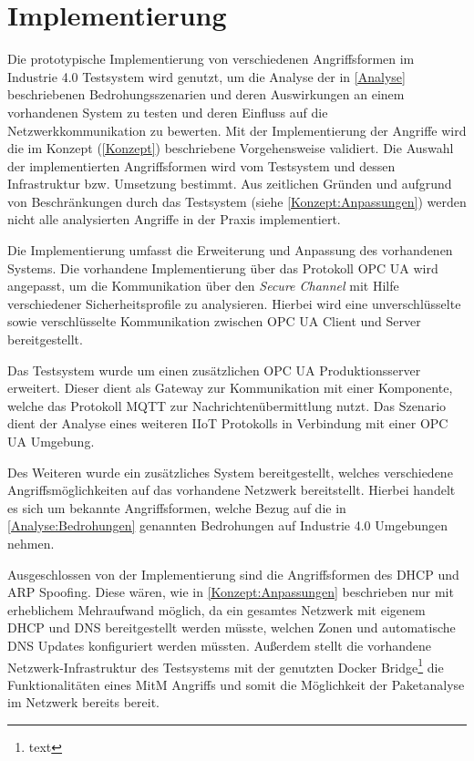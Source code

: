 \chapter{Implementierung}
Die prototypische Implementierung von verschiedenen Angriffsformen im Industrie 4.0 Testsystem wird genutzt, um die Analyse der in \autoref{Analyse} beschriebenen Bedrohungsszenarien und deren Auswirkungen an einem vorhandenen System zu testen und deren Einfluss auf die Netzwerkkommunikation zu bewerten. Mit der Implementierung der Angriffe wird die im Konzept (\autoref{Konzept}) beschriebene Vorgehensweise validiert. Die Auswahl der implementierten Angriffsformen wird vom Testsystem und dessen Infrastruktur bzw. Umsetzung bestimmt. Aus zeitlichen Gründen und aufgrund von Beschränkungen durch das Testsystem (siehe \autoref{Konzept:Anpassungen}) werden nicht alle analysierten Angriffe in der Praxis implementiert.

Die Implementierung umfasst die Erweiterung und Anpassung des vorhandenen Systems. Die vorhandene Implementierung über das Protokoll \ac{OPC UA} wird angepasst, um die Kommunikation über den \textit{Secure Channel} mit Hilfe verschiedener Sicherheitsprofile zu analysieren. Hierbei wird eine unverschlüsselte sowie verschlüsselte Kommunikation zwischen \ac{OPC UA} Client und Server bereitgestellt.

Das Testsystem wurde um einen zusätzlichen \ac{OPC UA} Produktionsserver erweitert. Dieser dient als Gateway zur Kommunikation mit einer Komponente, welche das Protokoll \ac{MQTT} zur Nachrichtenübermittlung nutzt. Das Szenario dient der Analyse eines weiteren \ac{IIoT} Protokolls in Verbindung mit einer \ac{OPC UA} Umgebung.

Des Weiteren wurde ein zusätzliches System bereitgestellt, welches verschiedene Angriffsmöglichkeiten auf das vorhandene Netzwerk bereitstellt. Hierbei handelt es sich um bekannte Angriffsformen, welche Bezug auf die in \autoref{Analyse:Bedrohungen} genannten Bedrohungen auf Industrie 4.0 Umgebungen nehmen.

Ausgeschlossen von der Implementierung sind die Angriffsformen des \ac{DHCP} und \ac{ARP} Spoofing. Diese wären, wie in \autoref{Konzept:Anpassungen} beschrieben nur mit erheblichem Mehraufwand möglich, da ein gesamtes Netzwerk mit eigenem \ac{DHCP} und \ac{DNS} bereitgestellt werden müsste, welchen Zonen und automatische DNS Updates konfiguriert werden müssten. Außerdem stellt die vorhandene Netzwerk-Infrastruktur des Testsystems mit der genutzten Docker Bridge\footnote{text} die Funktionalitäten eines \ac{MitM} Angriffs und somit die Möglichkeit der Paketanalyse im Netzwerk bereits bereit.

